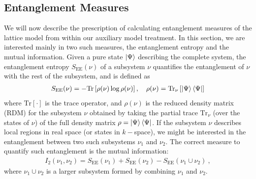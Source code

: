 \documentclass[reprint,hidelinks,onecolumn]{revtex4-2}
\begin{document}
\subsection{Entanglement Measures}
We will now describe the prescription of calculating entanglement measures of the lattice model from within our auxiliary model treatment. In this section, we are interested mainly in two such measures, the entanglement entropy and the mutual information. Given a pure state \(\ket{\Psi}\) describing the complete system, the entanglement entropy \(S_\text{EE}(\nu)\) of a subsystem \(\nu\) quantifies the entanglement of \(\nu\) with the rest of the subsystem, and is defined as
\begin{equation}\begin{aligned}
	S_\text{EE}(\nu) = -\text{Tr}\left[\rho(\nu)\log \rho(\nu)\right],\quad \rho(\nu) = \text{Tr}_\nu\left[\ket{\Psi}\bra{\Psi}\right] 
\end{aligned}\end{equation}
where \(\text{Tr}\left[\cdot\right] \) is the trace operator, and \(\rho(\nu)\) is the reduced density matrix (RDM) for the subsystem \(\nu\) obtained by taking the partial trace \(\text{Tr}_\nu\) (over the states of \(\nu\)) of the full density matrix \(\rho = \ket{\Psi}\bra{\Psi}\). If the subsystem \(\nu\) describes local regions in real space (or states in \(k-\)space), we might be interested in the entanglement between two such subsystems \(\nu_1\) and \(\nu_2\). The correct measure to quantify such entanglement is the mutual information:
\begin{equation}\begin{aligned}
	I_2(\nu_1,\nu_2) = S_\text{EE}(\nu_1) + S_\text{EE}(\nu_2) - S_\text{EE}(\nu_1 \cup \nu_2)~,
\end{aligned}\end{equation}
where \(\nu_1 \cup \nu_2\) is a larger subsystem formed by combining \(\nu_1\) and \(\nu_2\).
\end{document}
